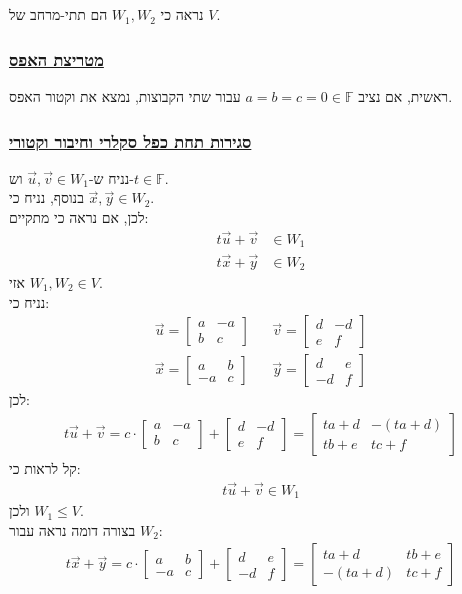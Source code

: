 \documentclass[a4paper, 12pt, leqno]{article}
\newcommand{\sub}[1]{\subsection{\underline{#1}}}
\newcommand{\subsub}[1]{\subsubsection{\underline{#1}}}
\newcommand{\F}{\ensuremath{\mathbb{F}}}
\newcommand{\eq}[1]{\begin{align*}#1\end{align*}}
\renewcommand{\leq}{\leqslant}
\begin{document}
\section{}
\setcounter{equation}{0}
\sub{}
נראה כי $W_1,W_2$ הם תתי-מרחב של $V$.
\subsub{מטריצת האפס}
ראשית, אם נציב $a=b=c=0\in\F$ עבור שתי הקבוצות, נמצא את וקטור האפס.
\subsub{סגירות תחת כפל סקלרי וחיבור וקטורי}
נניח ש-$\vec{u},\vec{v}\in{W_1}$ וש-$t\in\F$.\\
בנוסף, נניח כי $\vec{x},\vec{y}\in{W_2}$.\\
לכן, אם נראה כי מתקיים:
\eq{
    t\vec{u}+\vec{v}&\in{W_1}\\
    t\vec{x}+\vec{y}&\in{W_2}
}
אזי $W_1,W_2\in{V}$.\\
נניח כי:
\eq{
    \vec{u}=
    \begin{bmatrix}
        a & -a\\
        b & c
    \end{bmatrix}
    &&
    \vec{v}=
    \begin{bmatrix}
        d & -d\\
        e & f
    \end{bmatrix}
    \\
    \vec{x}=
    \begin{bmatrix}
        a & b\\
        -a & c
    \end{bmatrix}
    &&
    \vec{y}=
    \begin{bmatrix}
        d & e\\
        -d & f
    \end{bmatrix}
}
לכן:
\eq{
    t\vec{u}+\vec{v}=c\cdot \begin{bmatrix}
        a & -a\\
        b & c
    \end{bmatrix}
    +
    \begin{bmatrix}
        d & -d\\
        e & f
    \end{bmatrix}
    =
    \begin{bmatrix}
        ta+d & -(ta+d)\\
        tb+e & tc+f
    \end{bmatrix}
}
קל לראות כי:
\eq{
    t\vec{u}+\vec{v}\in{W_1}
}
ולכן $W_1\leq{V}$.\\
בצורה דומה נראה עבור $W_2$:
\eq{
    t\vec{x}+\vec{y}=c\cdot \begin{bmatrix}
        a & b\\
        -a & c
    \end{bmatrix}
    +
    \begin{bmatrix}
        d & e\\
        -d & f
    \end{bmatrix}
    =
    \begin{bmatrix}
        ta+d & tb+e\\
        -(ta+d) & tc+f
    \end{bmatrix}
}
\end{document}
